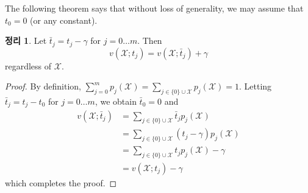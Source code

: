 \documentclass[12pt]{article} %
\newtheorem{theorem}{Theorem}
\theoremstyle{definition}
\newtheorem{theorem}{정리}
\theoremstyle{definition}
\begin{document}
The following theorem says that without loss of generality, we may assume that $t_0 = 0$ (or any constant).
\begin{theorem} \label{assumetzerozero}
Let $\bar t_j = t_j - \gamma$ for $j = 0 \dots m$. Then
\[v(\mathcal{X};  t_j) = v(\mathcal{X}; \bar t_j) + \gamma\] regardless of $\mathcal{X}$. 
\end{theorem}
\begin{proof}
By definition, $\sum_{j=0}^m p_j(\mathcal{X}) = \sum_{j \in \{0\}\cup\mathcal{X}} p_j(\mathcal{X}) = 1$. Letting $\bar t_j = t_j - t_0$ for $j = 0 \dots m$, we obtain $\bar t_0 = 0$ and
\begin{align}
v(\mathcal{X}; \bar t_j) &= \sum_{j\in \{0\}\cup\mathcal{X}}  \bar t_j p_j(\mathcal{X})\\
&=\sum_{j\in \{0\}\cup\mathcal{X}} (t_j - \gamma) p_j(\mathcal{X})\\
&=\sum_{j\in \{0\}\cup\mathcal{X}} t_j p_j(\mathcal{X})  - \gamma \\
&= v(\mathcal{X}; t_j) - \gamma
\end{align}
which completes the proof. 
\end{proof}
\end{document}

